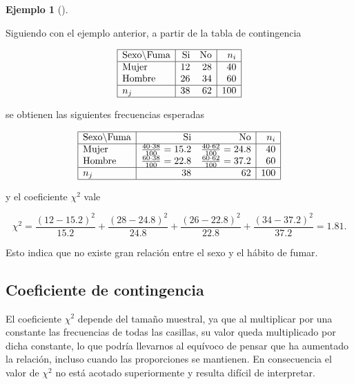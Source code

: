 \documentclass[
  a4paper,
]{scrreport}
\theoremstyle{plain}
\theoremstyle{definition}
\newtheorem{example}{Ejemplo}[chapter]
\theoremstyle{definition}
\theoremstyle{remark}
\begin{document}
\begin{example}[]\protect\hypertarget{exm-coeficiente-chi-cuadrado}{}\label{exm-coeficiente-chi-cuadrado}

Siguiendo con el ejemplo anterior, a partir de la tabla de contingencia

\[
\begin{array}{|l|rr|r|}
\hline
\mbox{Sexo}\backslash\mbox{Fuma} & \mbox{Si} & \mbox{No} & n_i\\
\hline
\mbox{Mujer} & 12 & 28 & 40 \\
\mbox{Hombre} & 26 & 34 & 60 \\
\hline
n_j & 38 & 62 & 100\\
\hline
\end{array}
\]

se obtienen las siguientes frecuencias esperadas

\[
\begin{array}{|l|rr|r|}
\hline
\mbox{Sexo}\backslash\mbox{Fuma} & \mbox{Si} & \mbox{No} & n_i\\
\hline
\mbox{Mujer} & \frac{40\cdot 38}{100}=15.2 & \frac{40\cdot 62}{100}=24.8 & 40 \\
\mbox{Hombre} & \frac{60\cdot 38}{100}=22.8 & \frac{60\cdot 62}{100}=37.2 & 60 \\
\hline
n_j & 38 & 62 & 100\\
\hline
\end{array}
\]

y el coeficiente \(\chi^2\) vale

\[\chi^2 = \frac{(12-15.2)^2}{15.2}+\frac{(28-24.8)^2}{24.8}+\frac{(26-22.8)^2}{22.8}+\frac{(34-37.2)^2}{37.2} = 1.81.\]

Esto indica que no existe gran relación entre el sexo y el hábito de
fumar.

\end{example}

\subsection{Coeficiente de
contingencia}\label{coeficiente-de-contingencia}

El coeficiente \(\chi^2\) depende del tamaño muestral, ya que al
multiplicar por una constante las frecuencias de todas las casillas, su
valor queda multiplicado por dicha constante, lo que podría llevarnos al
equívoco de pensar que ha aumentado la relación, incluso cuando las
proporciones se mantienen. En consecuencia el valor de \(\chi^2\) no
está acotado superiormente y resulta difícil de interpretar.
\end{document}
